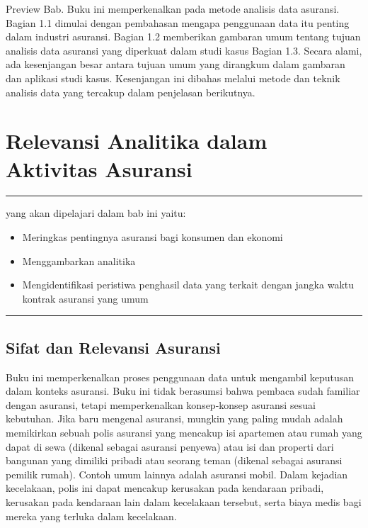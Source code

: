\documentclass[
]{book}
\providecommand{\tightlist}{%
  \setlength{\itemsep}{0pt}\setlength{\parskip}{0pt}}
\begin{document}
Preview Bab. Buku ini memperkenalkan pada metode analisis data asuransi. Bagian 1.1 dimulai dengan pembahasan mengapa penggunaan data itu penting dalam industri asuransi. Bagian 1.2 memberikan gambaran umum tentang tujuan analisis data asuransi yang diperkuat dalam studi kasus Bagian 1.3. Secara alami, ada kesenjangan besar antara tujuan umum yang dirangkum dalam gambaran dan aplikasi studi kasus. Kesenjangan ini dibahas melalui metode dan teknik analisis data yang tercakup dalam penjelasan berikutnya.

\hypertarget{relevansi-analitika-dalam-aktivitas-asuransi}{%
\section{Relevansi Analitika dalam Aktivitas Asuransi}\label{relevansi-analitika-dalam-aktivitas-asuransi}}

\begin{center}\rule{0.5\linewidth}{0.5pt}\end{center}

yang akan dipelajari dalam bab ini yaitu:

\begin{itemize}
\tightlist
\item
  Meringkas pentingnya asuransi bagi konsumen dan ekonomi
\item
  Menggambarkan analitika
\item
  Mengidentifikasi peristiwa penghasil data yang terkait dengan jangka waktu kontrak asuransi yang umum
\end{itemize}

\begin{center}\rule{0.5\linewidth}{0.5pt}\end{center}

\hypertarget{sifat-dan-relevansi-asuransi}{%
\subsection{Sifat dan Relevansi Asuransi}\label{sifat-dan-relevansi-asuransi}}

Buku ini memperkenalkan proses penggunaan data untuk mengambil keputusan dalam konteks asuransi. Buku ini tidak berasumsi bahwa pembaca sudah familiar dengan asuransi, tetapi memperkenalkan konsep-konsep asuransi sesuai kebutuhan. Jika baru mengenal asuransi, mungkin yang paling mudah adalah memikirkan sebuah polis asuransi yang mencakup isi apartemen atau rumah yang dapat di sewa (dikenal sebagai asuransi penyewa) atau isi dan properti dari bangunan yang dimiliki pribadi atau seorang teman (dikenal sebagai asuransi pemilik rumah). Contoh umum lainnya adalah asuransi mobil. Dalam kejadian kecelakaan, polis ini dapat mencakup kerusakan pada kendaraan pribadi, kerusakan pada kendaraan lain dalam kecelakaan tersebut, serta biaya medis bagi mereka yang terluka dalam kecelakaan.
\end{document}
